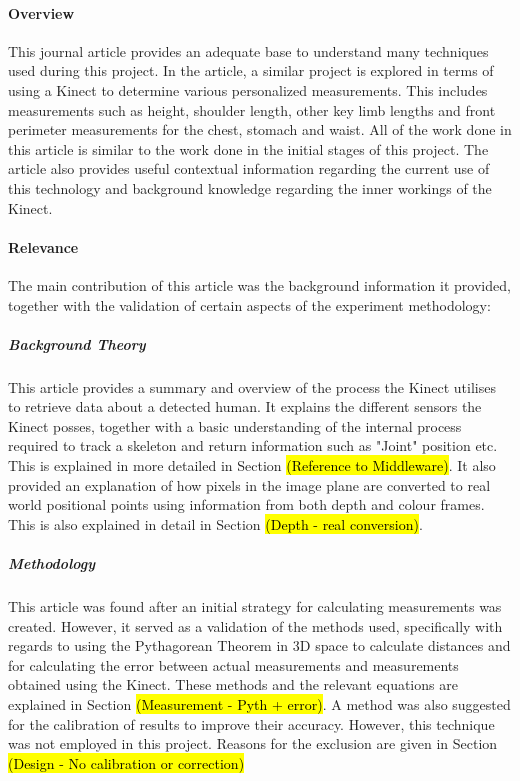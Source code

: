 \paragraph{Overview}
This journal article provides an adequate base to understand many techniques used during this project. In the article, a similar project is explored in terms of using a Kinect to determine various personalized measurements. This includes measurements such as height, shoulder length, other key limb lengths and front perimeter measurements for the chest, stomach and waist. All of the work done in this article is similar to the work done in the initial stages of this project. The article also provides useful contextual information regarding the current use of this technology and background knowledge regarding the inner workings of the Kinect. 

\paragraph{Relevance}
The main contribution of this article was the background information it provided, together with the validation of certain aspects of the experiment methodology: 

\subparagraph{Background Theory}
This article provides a summary and overview of the process the Kinect utilises to retrieve data about a detected human. It explains the different sensors the Kinect posses, together with a basic understanding of the internal process required to track a skeleton and return information such as "Joint" position etc. This is explained in more detailed in Section \hl{(Reference to Middleware)}. It also provided an explanation of how pixels in the image plane are converted to real world positional points using information from both depth and colour frames. This is also explained in detail in Section \hl{(Depth - real conversion)}.

\subparagraph{Methodology}
This article was found after an initial strategy for calculating measurements was created. However, it served as a validation of the methods used, specifically with regards to using the Pythagorean Theorem in 3D space to calculate distances and for calculating the error between actual measurements and measurements obtained using the Kinect. These methods and the relevant equations are explained in Section \hl{(Measurement - Pyth + error)}. A method was also suggested for the calibration of results to improve their accuracy. However, this technique was not employed in this project. Reasons for the exclusion are given in Section \hl{(Design - No calibration or correction)}


